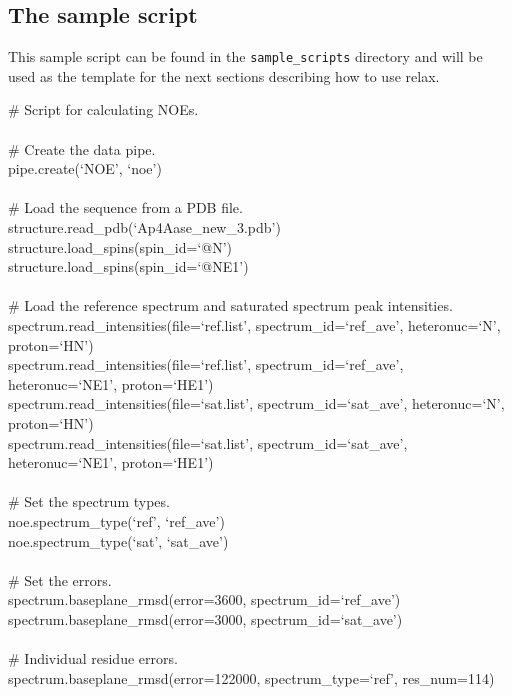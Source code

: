 \subsection{The sample script}

This sample script can be found in the \texttt{sample\_scripts} directory and will be used as the template for the next sections describing how to use relax.

\begin{exampleenv}
\# Script for calculating NOEs. \\
 \\
\# Create the data pipe. \\
pipe.create(`NOE', `noe') \\
 \\
\# Load the sequence from a PDB file. \\
structure.read\_pdb(`Ap4Aase\_new\_3.pdb') \\
structure.load\_spins(spin\_id=`@N') \\
structure.load\_spins(spin\_id=`@NE1') \\
 \\
\# Load the reference spectrum and saturated spectrum peak intensities. \\
spectrum.read\_intensities(file=`ref.list', spectrum\_id=`ref\_ave', heteronuc=`N', proton=`HN') \\
spectrum.read\_intensities(file=`ref.list', spectrum\_id=`ref\_ave', heteronuc=`NE1', proton=`HE1') \\
spectrum.read\_intensities(file=`sat.list', spectrum\_id=`sat\_ave', heteronuc=`N', proton=`HN') \\
spectrum.read\_intensities(file=`sat.list', spectrum\_id=`sat\_ave', heteronuc=`NE1', proton=`HE1') \\
 \\
\# Set the spectrum types. \\
noe.spectrum\_type(`ref', `ref\_ave') \\
noe.spectrum\_type(`sat', `sat\_ave') \\
 \\
\# Set the errors. \\
spectrum.baseplane\_rmsd(error=3600, spectrum\_id=`ref\_ave') \\
spectrum.baseplane\_rmsd(error=3000, spectrum\_id=`sat\_ave') \\
 \\
\# Individual residue errors. \\
spectrum.baseplane\_rmsd(error=122000, spectrum\_type=`ref', res\_num=114) \\

\end{exampleenv}
